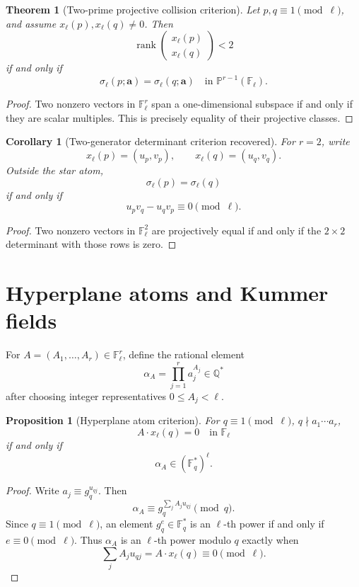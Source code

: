 \documentclass[11pt]{article}
\newtheorem{theorem}{Theorem}
\newtheorem{proposition}{Proposition}
\newtheorem{corollary}{Corollary}
\newcommand{\Q}{\mathbb Q}
\newcommand{\F}{\mathbb F}
\newcommand{\Pj}{\mathbb P}
\newcommand{\rank}{\operatorname{rank}}
\begin{document}
\begin{theorem}[Two-prime projective collision criterion]\label{T:projective-collision}
Let \(p,q\equiv1\pmod\ell\), and assume \(x_\ell(p),x_\ell(q)\ne0\).  Then
\[
\rank
\begin{pmatrix}
x_\ell(p)\\
x_\ell(q)
\end{pmatrix}
<2
\]
if and only if
\[
\sigma_\ell(p;\mathbf a)=\sigma_\ell(q;\mathbf a)
\quad\text{in }\Pj^{r-1}(\F_\ell).
\]
\end{theorem}

\begin{proof}
Two nonzero vectors in \(\F_\ell^r\) span a one-dimensional subspace if and only if they are scalar multiples.  This is precisely equality of their projective classes.
\end{proof}

\begin{corollary}[Two-generator determinant criterion recovered]\label{C:det-recovered}
For \(r=2\), write
\[
x_\ell(p)=(u_p,v_p),\qquad x_\ell(q)=(u_q,v_q).
\]
Outside the star atom,
\[
\sigma_\ell(p)=\sigma_\ell(q)
\]
if and only if
\[
u_pv_q-u_qv_p\equiv0\pmod\ell.
\]
\end{corollary}

\begin{proof}
Two nonzero vectors in \(\F_\ell^2\) are projectively equal if and only if the \(2\times2\) determinant with those rows is zero.
\end{proof}

\section{Hyperplane atoms and Kummer fields}

For \(A=(A_1,\ldots,A_r)\in\F_\ell^r\), define the rational element
\[
\alpha_A=\prod_{j=1}^r a_j^{A_j}\in\Q^*
\]
after choosing integer representatives \(0\le A_j<\ell\).

\begin{proposition}[Hyperplane atom criterion]\label{P:hyperplane}
For \(q\equiv1\pmod\ell\), \(q\nmid a_1\cdots a_r\),
\[
A\cdot x_\ell(q)=0\quad\text{in }\F_\ell
\]
if and only if
\[
\alpha_A\in(\F_q^*)^\ell.
\]
\end{proposition}

\begin{proof}
Write \(a_j\equiv g_q^{u_{qj}}\).  Then
\[
\alpha_A\equiv g_q^{\sum_j A_j u_{qj}}\pmod q.
\]
Since \(q\equiv1\pmod\ell\), an element \(g_q^e\in\F_q^*\) is an \(\ell\)-th power if and only if \(e\equiv0\pmod\ell\).  Thus \(\alpha_A\) is an \(\ell\)-th power modulo \(q\) exactly when
\[
\sum_j A_j u_{qj}=A\cdot x_\ell(q)\equiv0\pmod\ell.
\]
\end{proof}
\end{document}
